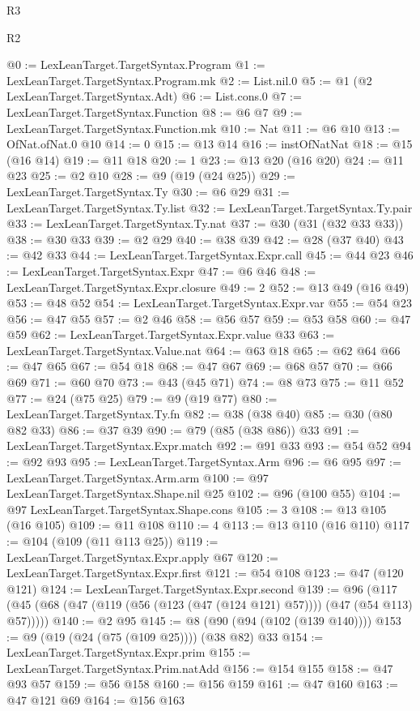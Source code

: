 \begin{lexlean}{R3}
\begin{lexlean}{R2}
\begin{coremodule}
{{{{{{{{{{{{{{{{{{{{{{@0 := LexLeanTarget.TargetSyntax.Program
@1 := LexLeanTarget.TargetSyntax.Program.mk
@2 := List.nil.{0}
@5 := @1 (@2 LexLeanTarget.TargetSyntax.Adt)
@6 := List.cons.{0}
@7 := LexLeanTarget.TargetSyntax.Function
@8 := @6 @7
@9 := LexLeanTarget.TargetSyntax.Function.mk
@10 := Nat
@11 := @6 @10
@13 := OfNat.ofNat.{0} @10
@14 := 0
@15 := @13 @14
@16 := instOfNatNat
@18 := @15 (@16 @14)
@19 := @11 @18
@20 := 1
@23 := @13 @20 (@16 @20)
@24 := @11 @23
@25 := @2 @10
@28 := @9 (@19 (@24 @25))
@29 := LexLeanTarget.TargetSyntax.Ty
@30 := @6 @29
@31 := LexLeanTarget.TargetSyntax.Ty.list
@32 := LexLeanTarget.TargetSyntax.Ty.pair
@33 := LexLeanTarget.TargetSyntax.Ty.nat
@37 := @30 (@31 (@32 @33 @33))
@38 := @30 @33
@39 := @2 @29
@40 := @38 @39
@42 := @28 (@37 @40)
@43 := @42 @33
@44 := LexLeanTarget.TargetSyntax.Expr.call
@45 := @44 @23
@46 := LexLeanTarget.TargetSyntax.Expr
@47 := @6 @46
@48 := LexLeanTarget.TargetSyntax.Expr.closure
@49 := 2
@52 := @13 @49 (@16 @49)
@53 := @48 @52
@54 := LexLeanTarget.TargetSyntax.Expr.var
@55 := @54 @23
@56 := @47 @55
@57 := @2 @46
@58 := @56 @57
@59 := @53 @58
@60 := @47 @59
@62 := LexLeanTarget.TargetSyntax.Expr.value @33
@63 := LexLeanTarget.TargetSyntax.Value.nat
@64 := @63 @18
@65 := @62 @64
@66 := @47 @65
@67 := @54 @18
@68 := @47 @67
@69 := @68 @57
@70 := @66 @69
@71 := @60 @70
@73 := @43 (@45 @71)
@74 := @8 @73
@75 := @11 @52
@77 := @24 (@75 @25)
@79 := @9 (@19 @77)
@80 := LexLeanTarget.TargetSyntax.Ty.fn
@82 := @38 (@38 @40)
@85 := @30 (@80 @82 @33)
@86 := @37 @39
@90 := @79 (@85 (@38 @86)) @33
@91 := LexLeanTarget.TargetSyntax.Expr.match
@92 := @91 @33
@93 := @54 @52
@94 := @92 @93
@95 := LexLeanTarget.TargetSyntax.Arm
@96 := @6 @95
@97 := LexLeanTarget.TargetSyntax.Arm.arm
@100 := @97 LexLeanTarget.TargetSyntax.Shape.nil @25
@102 := @96 (@100 @55)
@104 := @97 LexLeanTarget.TargetSyntax.Shape.cons
@105 := 3
@108 := @13 @105 (@16 @105)
@109 := @11 @108
@110 := 4
@113 := @13 @110 (@16 @110)
@117 := @104 (@109 (@11 @113 @25))
@119 := LexLeanTarget.TargetSyntax.Expr.apply @67
@120 := LexLeanTarget.TargetSyntax.Expr.first
@121 := @54 @108
@123 := @47 (@120 @121)
@124 := LexLeanTarget.TargetSyntax.Expr.second
@139 := @96 (@117 (@45 (@68 (@47 (@119 (@56 (@123 (@47 (@124 @121) @57)))) (@47 (@54 @113) @57)))))
@140 := @2 @95
@145 := @8 (@90 (@94 (@102 (@139 @140))))
@153 := @9 (@19 (@24 (@75 (@109 @25)))) (@38 @82) @33
@154 := LexLeanTarget.TargetSyntax.Expr.prim
@155 := LexLeanTarget.TargetSyntax.Prim.natAdd
@156 := @154 @155
@158 := @47 @93 @57
@159 := @56 @158
@160 := @156 @159
@161 := @47 @160
@163 := @47 @121 @69
@164 := @156 @163
}}}}}}}}}}}}}}}}}}}}}}
\end{coremodule}
\end{lexlean}
\end{lexlean}
